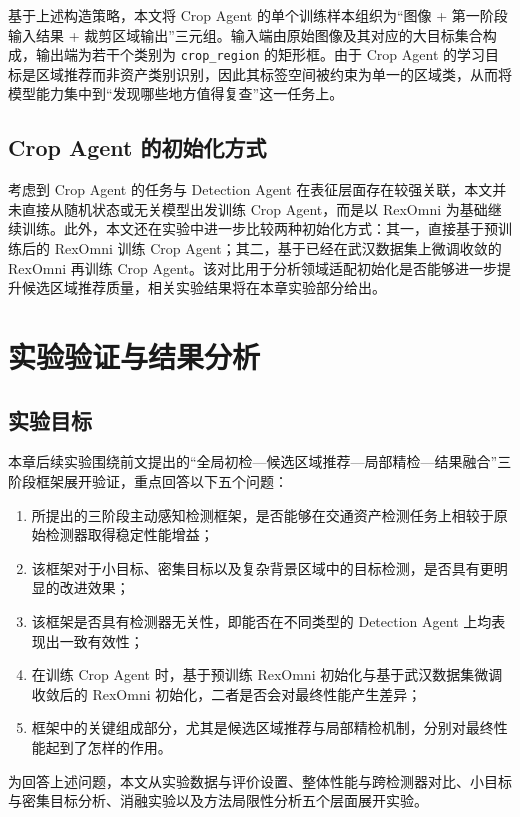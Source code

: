 基于上述构造策略，本文将 Crop Agent 的单个训练样本组织为“图像 + 第一阶段输入结果 + 裁剪区域输出”三元组。输入端由原始图像及其对应的大目标集合构成，输出端为若干个类别为 \texttt{crop\_region} 的矩形框。由于 Crop Agent 的学习目标是区域推荐而非资产类别识别，因此其标签空间被约束为单一的区域类，从而将模型能力集中到“发现哪些地方值得复查”这一任务上。

\subsection{Crop Agent 的初始化方式}

考虑到 Crop Agent 的任务与 Detection Agent 在表征层面存在较强关联，本文并未直接从随机状态或无关模型出发训练 Crop Agent，而是以 RexOmni 为基础继续训练。此外，本文还在实验中进一步比较两种初始化方式：其一，直接基于预训练后的 RexOmni 训练 Crop Agent；其二，基于已经在武汉数据集上微调收敛的 RexOmni 再训练 Crop Agent。该对比用于分析领域适配初始化是否能够进一步提升候选区域推荐质量，相关实验结果将在本章实验部分给出。

\section{实验验证与结果分析}
\label{sec:exp_setup}

\subsection{实验目标}

本章后续实验围绕前文提出的“全局初检—候选区域推荐—局部精检—结果融合”三阶段框架展开验证，重点回答以下五个问题：
\begin{enumerate}
    \item 所提出的三阶段主动感知检测框架，是否能够在交通资产检测任务上相较于原始检测器取得稳定性能增益；
    \item 该框架对于小目标、密集目标以及复杂背景区域中的目标检测，是否具有更明显的改进效果；
    \item 该框架是否具有检测器无关性，即能否在不同类型的 Detection Agent 上均表现出一致有效性；
    \item 在训练 Crop Agent 时，基于预训练 RexOmni 初始化与基于武汉数据集微调收敛后的 RexOmni 初始化，二者是否会对最终性能产生差异；
    \item 框架中的关键组成部分，尤其是候选区域推荐与局部精检机制，分别对最终性能起到了怎样的作用。
\end{enumerate}

为回答上述问题，本文从实验数据与评价设置、整体性能与跨检测器对比、小目标与密集目标分析、消融实验以及方法局限性分析五个层面展开实验。

